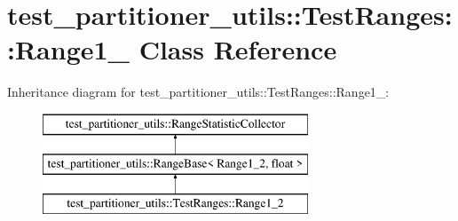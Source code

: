 \hypertarget{classtest__partitioner__utils_1_1TestRanges_1_1Range1__2}{}\section{test\+\_\+partitioner\+\_\+utils\+:\+:Test\+Ranges\+:\+:Range1\+\_ Class Reference}
\label{classtest__partitioner__utils_1_1TestRanges_1_1Range1__2}
Inheritance diagram for test\+\_\+partitioner\+\_\+utils\+:\+:Test\+Ranges\+:\+:Range1\+\_\+:\begin{figure}[H]
\begin{center}
\leavevmode
\includegraphics[height=3.000000cm]{classtest__partitioner__utils_1_1TestRanges_1_1Range1__2}
\end{center}
\end{figure}
